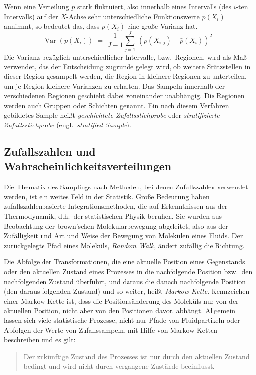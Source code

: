Wenn eine Verteilung $p$ stark fluktuiert, also innerhalb eines
Intervalls (des $i$-ten Intervalls) auf der $X$-Achse sehr unterschiedliche Funktionswerte $p(X_i)$ annimmt,
so bedeutet das, dass $p(X_i)$ eine große Varianz hat.
\begin{equation}
\operatorname{Var}(p(X_i)) \; = \; \frac{1}{J-1} \sum_{j=1}^J \, \left(p(X_{i,j})- \bar p(X_i)\right)^2 .
\end{equation}
Die Varianz bezüglich unterschiedlicher Intervalle, bzw.\ Regionen, wird als Maß verwendet,
das der Entscheidung zugrunde gelegt wird, ob weitere Stützstellen in dieser Region
gesampelt werden, die Region in kleinere Regionen zu unterteilen, um je Region kleinere Varianzen
zu erhalten.
Das Sampeln innerhalb der verschiedenen Regionen geschieht dabei
voneinander unabhängig. Die Regionen werden auch Gruppen oder Schichten genannt.
Ein nach diesem Verfahren gebildetes Sample heißt \textsl{geschichtete Zufallsstichprobe}
oder \textsl{stratifizierte Zufallsstichprobe} (engl.\ \textsl{stratified Sample}).

\subsection{Zufallszahlen und Wahrscheinlichkeitsverteilungen}
Die Thematik des Samplings nach Methoden, bei denen Zufallszahlen verwendet werden, ist ein
weites Feld in der Statistik. Große Bedeutung haben zufallszahlenbasierte Integrationsmethoden,
die auf Erkenntnissen aus der Thermodynamik, d.h.\ der statistischen Physik beruhen.
Sie wurden aus Beobachtung der brown'schen Molekularbewegung abgeleitet, also aus der
Zufälligkeit und Art und Weise der Bewegung von Molekülen eines Fluids.
Der zurückgelegte Pfad eines Moleküls, \textsl{Random Walk},
ändert zufällig die Richtung.

Die Abfolge der Transformationen, die eine aktuelle Position eines Gegenstands oder den
aktuellen Zustand eines Prozesses in die nachfolgende Position bzw.\ den nachfolgenden
Zustand überführt, und daraus die danach nachfolgende Position (den daraus folgenden Zustand)
und so weiter, heißt \textsl{Markow-Kette}. Kennzeichen einer Markow-Kette ist, dass die
Positions\-änder\-ung des Moleküls nur von der aktuellen Position,
nicht aber von den Positionen davor, abhängt. Allgemein lassen sich viele statistische Prozesse,
nicht nur Pfade von Fluidpartikeln oder Abfolgen der Werte von Zufallssampeln, mit Hilfe von
Markow-Ketten beschreiben und es gilt:
\begin{quote}
Der zukünftige Zustand des Prozesses ist nur durch den
aktuellen Zustand bedingt und wird nicht durch vergangene Zustände beeinflusst.
\end{quote}

